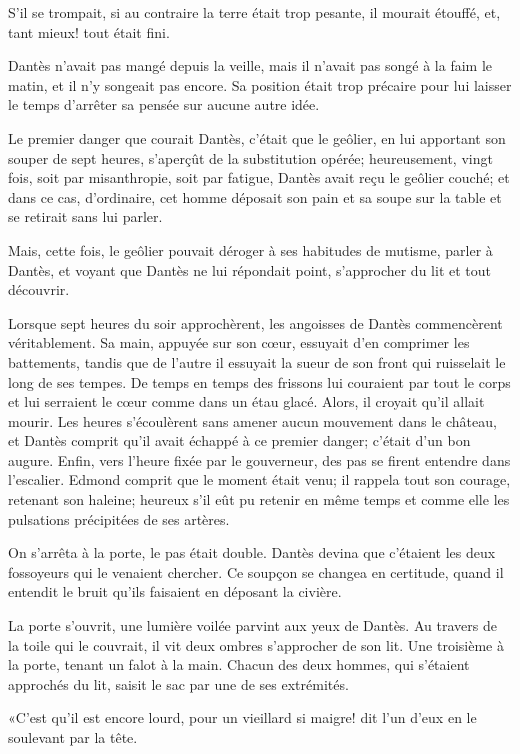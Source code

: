 S'il se trompait, si au contraire la terre était trop pesante, il mourait étouffé, et, tant mieux! tout était fini.

Dantès n'avait pas mangé depuis la veille, mais il n'avait pas songé à la faim le matin, et il n'y songeait pas encore. Sa position était trop précaire pour lui laisser le temps d'arrêter sa pensée sur aucune autre idée.

Le premier danger que courait Dantès, c'était que le geôlier, en lui apportant son souper de sept heures, s'aperçût de la substitution opérée; heureusement, vingt fois, soit par misanthropie, soit par fatigue, Dantès avait reçu le geôlier couché; et dans ce cas, d'ordinaire, cet homme déposait son pain et sa soupe sur la table et se retirait sans lui parler.

Mais, cette fois, le geôlier pouvait déroger à ses habitudes de mutisme, parler à Dantès, et voyant que Dantès ne lui répondait point, s'approcher du lit et tout découvrir.

Lorsque sept heures du soir approchèrent, les angoisses de Dantès commencèrent véritablement. Sa main, appuyée sur son cœur, essuyait d'en comprimer les battements, tandis que de l'autre il essuyait la sueur de son front qui ruisselait le long de ses tempes. De temps en temps des frissons lui couraient par tout le corps et lui serraient le cœur comme dans un étau glacé. Alors, il croyait qu'il allait mourir. Les heures s'écoulèrent sans amener aucun mouvement dans le château, et Dantès comprit qu'il avait échappé à ce premier danger; c'était d'un bon augure. Enfin, vers l'heure fixée par le gouverneur, des pas se firent entendre dans l'escalier. Edmond comprit que le moment était venu; il rappela tout son courage, retenant son haleine; heureux s'il eût pu retenir en même temps et comme elle les pulsations précipitées de ses artères.

On s'arrêta à la porte, le pas était double. Dantès devina que c'étaient les deux fossoyeurs qui le venaient chercher. Ce soupçon se changea en certitude, quand il entendit le bruit qu'ils faisaient en déposant la civière.

La porte s'ouvrit, une lumière voilée parvint aux yeux de Dantès. Au travers de la toile qui le couvrait, il vit deux ombres s'approcher de son lit. Une troisième à la porte, tenant un falot à la main. Chacun des deux hommes, qui s'étaient approchés du lit, saisit le sac par une de ses extrémités.

«C'est qu'il est encore lourd, pour un vieillard si maigre! dit l'un d'eux en le soulevant par la tête.

